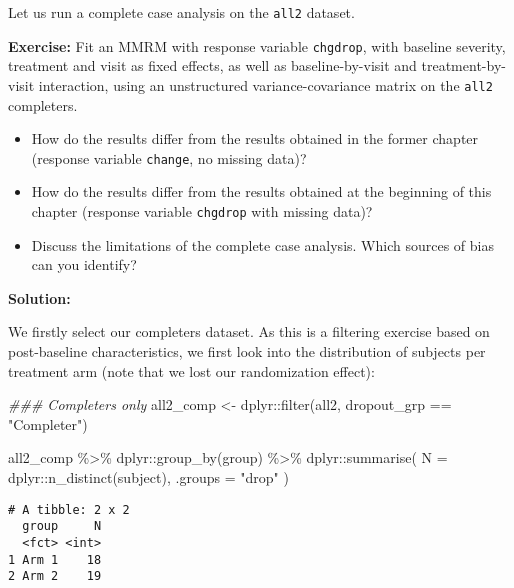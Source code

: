 \documentclass[
  letterpaper,
  DIV=11,
  numbers=noendperiod]{scrreprt}
\newenvironment{Shaded}{\begin{snugshade}}{\end{snugshade}}
\newcommand{\AttributeTok}[1]{\textcolor[rgb]{0.40,0.45,0.13}{#1}}
\newcommand{\DocumentationTok}[1]{\textcolor[rgb]{0.37,0.37,0.37}{\textit{#1}}}
\newcommand{\FunctionTok}[1]{\textcolor[rgb]{0.28,0.35,0.67}{#1}}
\newcommand{\NormalTok}[1]{\textcolor[rgb]{0.00,0.23,0.31}{#1}}
\newcommand{\OtherTok}[1]{\textcolor[rgb]{0.00,0.23,0.31}{#1}}
\newcommand{\SpecialCharTok}[1]{\textcolor[rgb]{0.37,0.37,0.37}{#1}}
\newcommand{\StringTok}[1]{\textcolor[rgb]{0.13,0.47,0.30}{#1}}
\begin{document}
Let us run a complete case analysis on the \texttt{all2} dataset.

\textbf{Exercise:} Fit an MMRM with response variable \texttt{chgdrop},
with baseline severity, treatment and visit as fixed effects, as well as
baseline-by-visit and treatment-by-visit interaction, using an
unstructured variance-covariance matrix on the \texttt{all2} completers.

\begin{itemize}
\item
  How do the results differ from the results obtained in the former
  chapter (response variable \texttt{change}, no missing data)?
\item
  How do the results differ from the results obtained at the beginning
  of this chapter (response variable \texttt{chgdrop} with missing
  data)?
\item
  Discuss the limitations of the complete case analysis. Which sources
  of bias can you identify?
\end{itemize}

\textbf{Solution:}

We firstly select our completers dataset. As this is a filtering
exercise based on post-baseline characteristics, we first look into the
distribution of subjects per treatment arm (note that we lost our
randomization effect):

\begin{Shaded}
\begin{Highlighting}[]
\DocumentationTok{\#\#\# Completers only}
\NormalTok{all2\_comp }\OtherTok{\textless{}{-}}\NormalTok{ dplyr}\SpecialCharTok{::}\FunctionTok{filter}\NormalTok{(all2, dropout\_grp }\SpecialCharTok{==} \StringTok{"Completer"}\NormalTok{)}

\NormalTok{all2\_comp }\SpecialCharTok{\%\textgreater{}\%} 
\NormalTok{  dplyr}\SpecialCharTok{::}\FunctionTok{group\_by}\NormalTok{(group) }\SpecialCharTok{\%\textgreater{}\%} 
\NormalTok{  dplyr}\SpecialCharTok{::}\FunctionTok{summarise}\NormalTok{(}
    \AttributeTok{N =}\NormalTok{ dplyr}\SpecialCharTok{::}\FunctionTok{n\_distinct}\NormalTok{(subject),}
    \AttributeTok{.groups =} \StringTok{"drop"}
\NormalTok{  )}
\end{Highlighting}
\end{Shaded}

\begin{verbatim}
# A tibble: 2 x 2
  group     N
  <fct> <int>
1 Arm 1    18
2 Arm 2    19
\end{verbatim}
\end{document}

